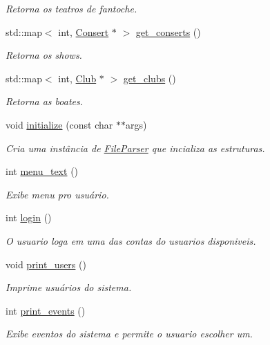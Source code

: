 \begin{DoxyCompactItemize}
\begin{DoxyCompactList}\small\item\em Retorna os teatros de fantoche. \end{DoxyCompactList}\item 
std\+::map$<$ int, \hyperlink{class_consert}{Consert} $\ast$ $>$ \hyperlink{class_box_office_a07aef87f21cd6791c3ede1159eeee076}{get\+\_\+conserts} ()
\begin{DoxyCompactList}\small\item\em Retorna os shows. \end{DoxyCompactList}\item 
std\+::map$<$ int, \hyperlink{class_club}{Club} $\ast$ $>$ \hyperlink{class_box_office_a8d956508e66e2d8586f17cf34958eba6}{get\+\_\+clubs} ()
\begin{DoxyCompactList}\small\item\em Retorna as boates. \end{DoxyCompactList}\item 
void \hyperlink{class_box_office_a066af638cdd43041a0805567ff526ef3}{initialize} (const char $\ast$$\ast$args)
\begin{DoxyCompactList}\small\item\em Cria uma instância de \hyperlink{class_file_parser}{File\+Parser} que incializa as estruturas. \end{DoxyCompactList}\item 
int \hyperlink{class_box_office_a1f010f4714351c2f08c7c8940b094914}{menu\+\_\+text} ()
\begin{DoxyCompactList}\small\item\em Exibe menu pro usuário. \end{DoxyCompactList}\item 
int \hyperlink{class_box_office_a04f554e383b6c6f462473403ae056648}{login} ()
\begin{DoxyCompactList}\small\item\em O usuario loga em uma das contas do usuarios disponiveis. \end{DoxyCompactList}\item 
void \hyperlink{class_box_office_a24319af273392225975051add861e037}{print\+\_\+users} ()
\begin{DoxyCompactList}\small\item\em Imprime usuários do sistema. \end{DoxyCompactList}\item 
int \hyperlink{class_box_office_a069cc696cc665eeb00419eed14ef1c45}{print\+\_\+events} ()
\begin{DoxyCompactList}\small\item\em Exibe eventos do sistema e permite o usuario escolher um. \end{DoxyCompactList}\item 
$$
\end{DoxyCompactItemize}

